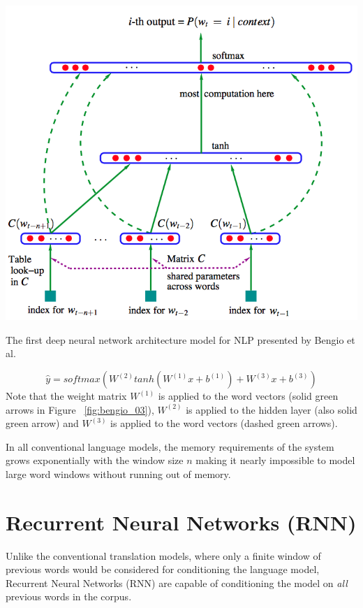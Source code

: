 \documentclass{tufte-handout}
\begin{document}
\begin{marginfigure}
	\centering
	\includegraphics[width=\linewidth]{bengio_03.png}
	\caption {The first deep neural network architecture model for NLP presented by Bengio et al.}
	\label{fig:bengio_03}
\end{marginfigure}

\begin{equation}
	\hat{y} = softmax (W^{(2)} tanh(W^{(1)}x+b^{(1)})+W^{(3)}x+b^{(3)})
	\label{eqn:bengio_eqn}
\end{equation}
Note that the weight matrix $W^{(1)}$ is applied to the word vectors (solid green arrows in Figure ~\ref{fig:bengio_03}), $W^{(2)}$ is applied to the hidden layer (also solid green arrow) and $W^{(3)}$ is applied to the word vectors (dashed green arrows).

In all conventional language models, the memory requirements of the system grows exponentially with the window size $n$ making it nearly impossible to model large word windows without running out of memory.

\section{Recurrent Neural Networks (RNN)}
Unlike the conventional translation models, where only a finite window of previous words would be considered for conditioning the language model, Recurrent Neural Networks (RNN) are capable of conditioning the model on \textit{all} previous words in the corpus. 
\end{document}
